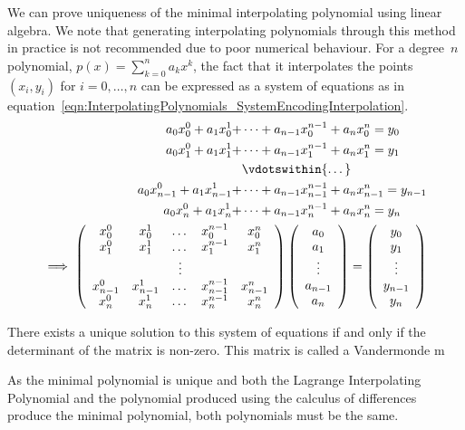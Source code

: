 We can prove uniqueness of the minimal interpolating polynomial using linear algebra. We note that generating interpolating polynomials through this method in practice is not recommended due to poor numerical behaviour. For a degree~$n$ polynomial, $p(x) = \sum_{k=0}^n a_k x^k$, the fact that it interpolates the points $(x_i, y_i)$ for $i = 0, \dots, n$ can be expressed as a system of equations as in equation~\eqref{eqn:InterpolatingPolynomials_SystemEncodingInterpolation}.
\begin{alignat}
	\begin{split}
		a_0 x_0^0 + a_1 x_0^1 + &\dots + a_{n-1}x_0^{n-1} + a_nx_0^n = y_0  \\
		a_0 x_1^0 + a_1 x_1^1 + &\dots + a_{n-1}x_1^{n-1} + a_nx_1^n = y_1  \\
		&\vdotswithin{\dots}  \\
		a_0 x_{n-1}^0 + a_1 x_{n-1}^1 + &\dots + a_{n-1}x_{n-1}^{n-1} + a_nx_{n-1}^n = y_{n-1}  \\
		a_0 x_n^0 + a_1 x_n^1 + &\dots + a_{n-1}x_n^{n-1} + a_nx_n^n = y_n  \\
	\end{split}  \\
	\implies
	\left( \begin{array}{ccccc}
		x_0^0 & x_0^1 & \dots & x_0^{n-1} & x_0^n \\
		x_1^0 & x_1^1 & \dots & x_1^{n-1} & x_1^n \\
		& & \vdots & & \\
		x_{n-1}^0 & x_{n-1}^1 & \dots & x_{n-1}^{n-1} & x_{n-1}^n \\
		x_n^0 & x_n^1 & \dots & x_n^{n-1} & x_n^n \\
	\end{array} \right)
	\left( \begin{array}{c}
		a_0 \\ a_1 \\ \vdots \\ a_{n-1} \\ a_n
	\end{array} \right) =
	\left( \begin{array}{c} y_0 \\ y_1 \\ \vdots \\ y_{n-1} \\ y_n
	\end{array} \right)
	\label{eqn:InterpolatingPolynomials_SystemEncodingInterpolation}
\end{alignat}

There exists a unique solution to this system of equations if and only if the determinant of the matrix is non-zero. This matrix is called a Vandermonde m

As the minimal polynomial is unique and both the Lagrange Interpolating Polynomial and the polynomial produced using the calculus of differences produce the minimal polynomial, both polynomials must be the same.